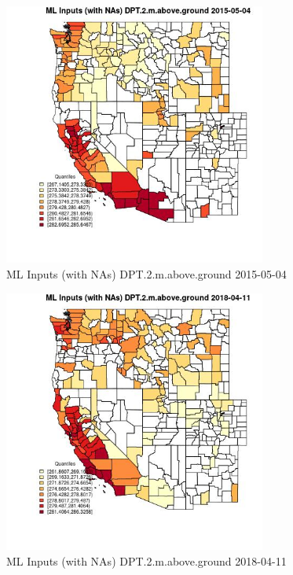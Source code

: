 \begin{figure} 
\centering  
\includegraphics[width=0.77\textwidth]{Code_Outputs/Report_ML_input_PM25_Step4_part_e_de_duplicated_aves_compiled_2019-05-18wNAs_CountyDPT2mabovegroundMean2015-05-04_2015-05-04.jpg} 
\caption{\label{fig:Report_ML_input_PM25_Step4_part_e_de_duplicated_aves_compiled_2019-05-18wNAsCountyDPT2mabovegroundMean2015-05-04_2015-05-04}ML Inputs (with NAs) DPT.2.m.above.ground 2015-05-04} 
\end{figure} 
 

\begin{figure} 
\centering  
\includegraphics[width=0.77\textwidth]{Code_Outputs/Report_ML_input_PM25_Step4_part_e_de_duplicated_aves_compiled_2019-05-18wNAs_CountyDPT2mabovegroundMean2018-04-11_2018-04-11.jpg} 
\caption{\label{fig:Report_ML_input_PM25_Step4_part_e_de_duplicated_aves_compiled_2019-05-18wNAsCountyDPT2mabovegroundMean2018-04-11_2018-04-11}ML Inputs (with NAs) DPT.2.m.above.ground 2018-04-11} 
\end{figure} 
 

